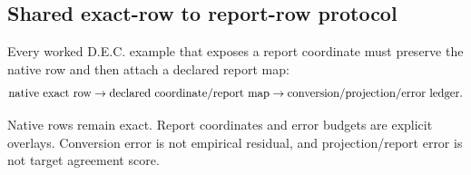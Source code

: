 \subsection{Shared exact-row to report-row protocol}

Every worked D.E.C. example that exposes a report coordinate must preserve the native row and then attach a declared report map:
\[
\hbox{native exact row}\rightarrow\hbox{declared coordinate/report map}\rightarrow\hbox{conversion/projection/error ledger}.
\]

Native rows remain exact.  Report coordinates and error budgets are explicit overlays.  Conversion error is not empirical residual, and projection/report error is not target agreement score.
